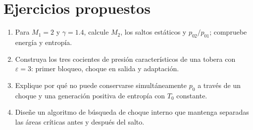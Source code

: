 \section{Ejercicios propuestos}
\begin{enumerate}
\item Para $M_1=2$ y $\gamma=1.4$, calcule $M_2$, los saltos estáticos y $p_{02}/p_{01}$; compruebe energía y entropía.
\item Construya los tres cocientes de presión característicos de una tobera con $\varepsilon=3$: primer bloqueo, choque en salida y adaptación.
\item Explique por qué no puede conservarse simultáneamente $p_0$ a través de un choque y una generación positiva de entropía con $T_0$ constante.
\item Diseñe un algoritmo de búsqueda de choque interno que mantenga separadas las áreas críticas antes y después del salto.
\end{enumerate}
